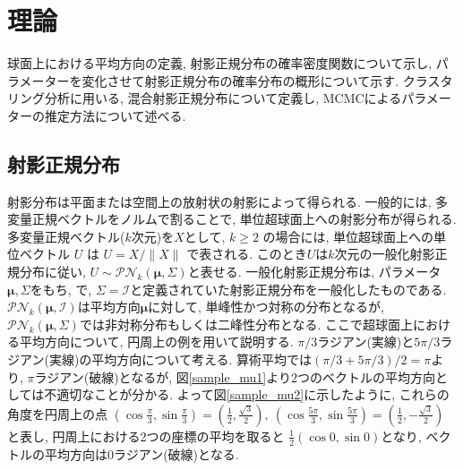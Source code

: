 \documentclass[a4j,12pt]{jarticle}
\begin{document}

\section{理論}

球面上における平均方向の定義, 射影正規分布の確率密度関数について示し, パラメーターを変化させて射影正規分布の確率分布の概形について示す. クラスタリング分析に用いる, 混合射影正規分布について定義し, MCMCによるパラメーターの推定方法について述べる.  

\subsection{射影正規分布}

射影分布は平面または空間上の放射状の射影によって得られる. 一般的には, 多変量正規ベクトルをノルムで割ることで, 単位超球面上への射影分布が得られる. 多変量正規ベクトル($k$次元)を$X$として, $k \geq 2$ の場合には, 単位超球面上への単位ベクトル $U$ は $U = X/\|X\|$ で表される. このとき$U$は$k$次元の一般化射影正規分布に従い, $U \sim \mathcal{PN}_k(\bm \mu,\Sigma)$と表せる. 一般化射影正規分布は, パラメータ$\bm \mu, \Sigma$をもち, \citet{PML}で, $\Sigma = \mathcal{I}$と定義されていた射影正規分布を一般化したものである. $\mathcal{PN}_k(\bm \mu,\mathcal{I})$は平均方向$\bm \mu$に対して, 単峰性かつ対称の分布となるが, $\mathcal{PN}_k(\bm \mu,\Sigma)$では非対称分布もしくは二峰性分布となる. ここで超球面上における平均方向について, 円周上の例を用いて説明する. $\pi/3$ラジアン(実線)と$5\pi/3$ラジアン(実線)の平均方向について考える. 算術平均では$(\pi/3 + 5\pi/3)/2 = \pi$より, $\pi$ラジアン(破線)となるが, 図\ref{sample_mu1}より$2$つのベクトルの平均方向としては不適切なことが分かる. よって図\ref{sample_mu2}に示したように, これらの角度を円周上の点 $(\cos \frac{\pi}{3},\sin \frac{\pi}{3}) = (\frac{1}{2},\frac{\sqrt{3}}{2}),\ (\cos \frac{5\pi}{3}, \sin \frac{5\pi}{3}) = (\frac{1}{2},- \frac{\sqrt{3}}{2})$ と表し, 円周上における2つの座標の平均を取ると $\frac{1}{2} (\cos 0, \sin 0)$となり, ベクトルの平均方向は$0$ラジアン(破線)となる. 
\end{document}

